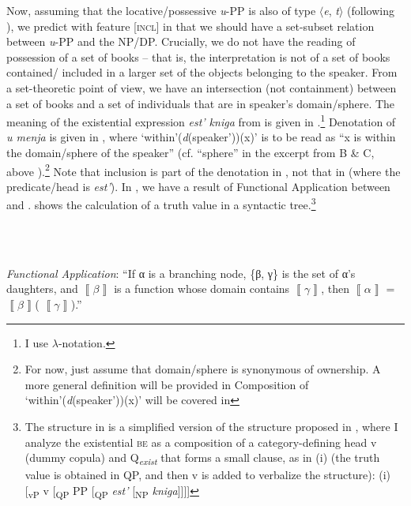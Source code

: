 \documentclass[output=paper,colorlinks,citecolor=brown]{./langscibook}
\begin{document}
Now, assuming that the locative/possessive \textit{u}{}-PP is also of type ${\langle}$\textit{e}, \textit{t}${\rangle}$ (following \citealt[65]{HeimKratzer1998}), we predict with feature [\textsc{incl}] in  that we should have a set-subset relation between \textit{u}{}-PP and the NP/DP. Crucially, we do not have the reading of possession of a set of books – that is, the interpretation is not of a set of books contained/ included in a larger set of the objects belonging to the speaker. From a set-theoretic point of view, we have an intersection (not containment) between a set of books and a set of individuals that are in speaker’s domain/sphere. The meaning of the existential expression \textit{est’ kniga} from  is given in .\footnote{I use  \textrm{${\lambda}$}{}-notation.} Denotation of \textit{u menja} is given in , where ‘within'(\textit{d}(speaker'))(x)’ is to be read as “x is within the domain/sphere of the speaker” (cf. “sphere” in the excerpt from B \& C, above ).\footnote{For now, just assume that domain/sphere is synonymous of ownership. A more general definition will be provided in  Composition of ‘within\textrm{'}(\textit{d}(speaker\textrm{'}))(x)’ will be covered in }  Note that inclusion is part of the denotation in , not that in  (where the predicate/head is \textit{est’}). In , we have a result of Functional Application between  and .  shows the calculation of a truth value in a syntactic tree.\footnote{The structure in  is a simplified version of the structure proposed in \citet{TsedrykInPress}, where I analyze the existential \textsc{be} as a composition of a category-defining head v (dummy copula) and Q\textit{\textsubscript{exist}} that forms a small clause, as in (i) (the truth value is obtained in QP, and then v is added to verbalize the structure):   (i)  [\textsubscript{vP} v [\textsubscript{QP} PP [\textsubscript{QP} \textit{est’} [\textsubscript{NP} \textit{kniga}]]]]} 

\ea%
    \label{ex:tsedryk:10}
    \gll\\
        \\
    \glt
    \z

          \textit{Functional Application}: “If α is a branching node, \{β, γ\} is the set of α’s daughters, and  $\left\llbracket \beta \right\rrbracket $  is a function whose domain contains  $\left\llbracket \gamma \right\rrbracket $, then  $\left\llbracket \alpha \right\rrbracket $ =  $\left\llbracket \beta \right\rrbracket $( $\left\llbracket \gamma \right\rrbracket $).” \citep[44]{HeimKratzer1998}
\end{document}
